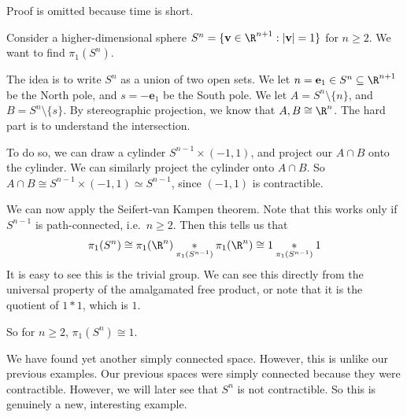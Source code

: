 \documentclass[a4paper]{article}
\begin{document}
Proof is omitted because time is short. %

\begin{eg}
  Consider a higher-dimensional sphere $S^n = \{\mathbf{v} \in \R^{n + 1}: |\mathbf{v}| = 1\}$ for $n \geq 2$. We want to find $\pi_1(S^n)$.

  The idea is to write $S^n$ as a union of two open sets. We let $n = \mathbf{e}_1 \in S^n \subseteq \R^{n + 1}$ be the North pole, and $s = -\mathbf{e}_1$ be the South pole. We let $A = S^n \setminus \{n\}$, and $B = S^n \setminus\{s\}$. By stereographic projection, we know that $A, B \cong \R^n$. The hard part is to understand the intersection.

  To do so, we can draw a cylinder $S^{n - 1} \times (-1, 1)$, and project our $A\cap B$ onto the cylinder. We can similarly project the cylinder onto $A\cap B$. So $A\cap B\cong S^{n - 1} \times (-1, 1) \simeq S^{n - 1}$, since $(-1, 1)$ is contractible.
  \begin{center}
  \end{center}
  We can now apply the Seifert-van Kampen theorem. Note that this works only if $S^{n - 1}$ is path-connected, i.e.\ $n \geq 2$. Then this tells us that
  \[
    \pi_1(S^n) \cong \pi_1(\R^n) \underset{\pi_1(S^{n - 1})}{*} \pi_1(\R^n) \cong 1 \underset{\pi_1(S^{n - 1})}{*} 1
  \]
  It is easy to see this is the trivial group. We can see this directly from the universal property of the amalgamated free product, or note that it is the quotient of $1 * 1$, which is $1$.

  So for $n \geq 2$, $\pi_1(S^n) \cong 1$.
\end{eg}
We have found yet another simply connected space. However, this is unlike our previous examples. Our previous spaces were simply connected because they were contractible. However, we will later see that $S^n$ is not contractible. So this is genuinely a new, interesting example.
\end{document}
